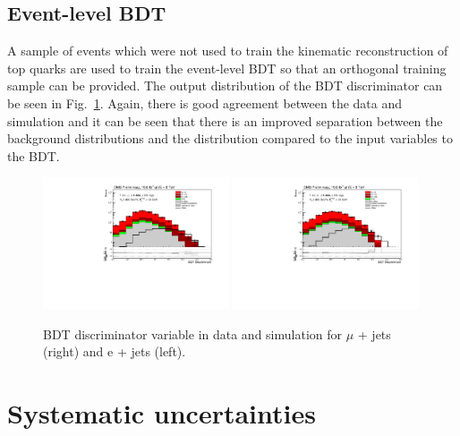 \subsection{Event-level BDT}
A sample of events which were not used to train the kinematic reconstruction of top quarks are used to train the event-level BDT so that an orthogonal training sample can be provided. 
The output distribution of the BDT discriminator can be seen in Fig.~\ref{fig:BDT}. Again, there is good agreement between the data and simulation and it can be seen that there is an improved separation between the background distributions and the \tttt distribution compared to the input variables to the BDT.

\begin{figure}[!ht]
    \includegraphics[width=0.49\textwidth]{images/Run1/MVA_Mu.pdf}
    \includegraphics[width=0.49\textwidth]{images/Run1/MVA_e.pdf}
    \caption{BDT discriminator variable in data and simulation for $\mu$ + jets (right) and e + jets (left).}
    \label{fig:BDT}
\end{figure}

\section{Systematic uncertainties}
\label{sec:uncertainties8}

